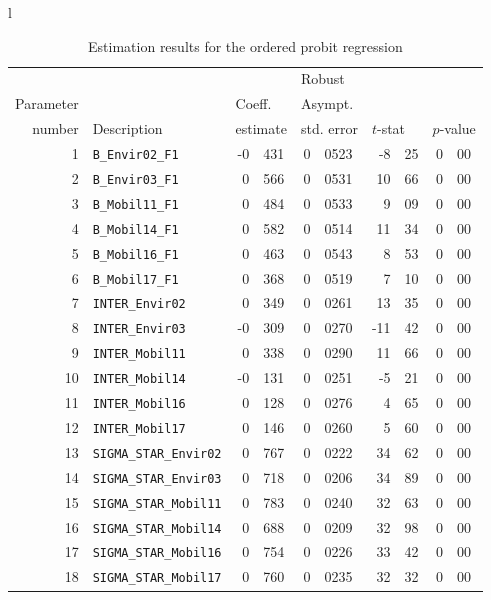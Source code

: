 \documentclass[12pt,a4paper]{article}
\begin{document}
\begin{table}[htb]
\caption{\label{tab:ordered}Estimation results for the ordered probit
  regression}
  \begin{tabular}{l}
\begin{tabular}{rlr@{.}lr@{.}lr@{.}lr@{.}l}
         &                       &   \multicolumn{2}{l}{}    & \multicolumn{2}{l}{Robust}  &     \multicolumn{4}{l}{}   \\
Parameter &                       &   \multicolumn{2}{l}{Coeff.}      & \multicolumn{2}{l}{Asympt.}  &     \multicolumn{4}{l}{}   \\
number &  Description                     &   \multicolumn{2}{l}{estimate}      & \multicolumn{2}{l}{std. error}  &   \multicolumn{2}{l}{$t$-stat}  &   \multicolumn{2}{l}{$p$-value}   \\

\hline

1 & \lstinline$B_Envir02_F1$ & -0&431 & 0&0523 & -8&25 & 0&00\\
2 & \lstinline$B_Envir03_F1$ & 0&566 & 0&0531 & 10&66 & 0&00\\
3 & \lstinline$B_Mobil11_F1$ & 0&484 & 0&0533 & 9&09 & 0&00\\
4 & \lstinline$B_Mobil14_F1$ & 0&582 & 0&0514 & 11&34 & 0&00\\
5 & \lstinline$B_Mobil16_F1$ & 0&463 & 0&0543 & 8&53 & 0&00\\
6 & \lstinline$B_Mobil17_F1$ & 0&368 & 0&0519 & 7&10 & 0&00\\
7 & \lstinline$INTER_Envir02$ & 0&349 & 0&0261 & 13&35 & 0&00\\
8 & \lstinline$INTER_Envir03$ & -0&309 & 0&0270 & -11&42 & 0&00\\
9 & \lstinline$INTER_Mobil11$ & 0&338 & 0&0290 & 11&66 & 0&00\\
10 & \lstinline$INTER_Mobil14$ & -0&131 & 0&0251 & -5&21 & 0&00\\
11 & \lstinline$INTER_Mobil16$ & 0&128 & 0&0276 & 4&65 & 0&00\\
12 & \lstinline$INTER_Mobil17$ & 0&146 & 0&0260 & 5&60 & 0&00\\
13 & \lstinline$SIGMA_STAR_Envir02$ & 0&767 & 0&0222 & 34&62 & 0&00\\
14 & \lstinline$SIGMA_STAR_Envir03$ & 0&718 & 0&0206 & 34&89 & 0&00\\
15 & \lstinline$SIGMA_STAR_Mobil11$ & 0&783 & 0&0240 & 32&63 & 0&00\\
16 & \lstinline$SIGMA_STAR_Mobil14$ & 0&688 & 0&0209 & 32&98 & 0&00\\
17 & \lstinline$SIGMA_STAR_Mobil16$ & 0&754 & 0&0226 & 33&42 & 0&00\\
18 & \lstinline$SIGMA_STAR_Mobil17$ & 0&760 & 0&0235 & 32&32 & 0&00\\
\end{tabular}
  \end{tabular}
\end{table}
\end{document}
